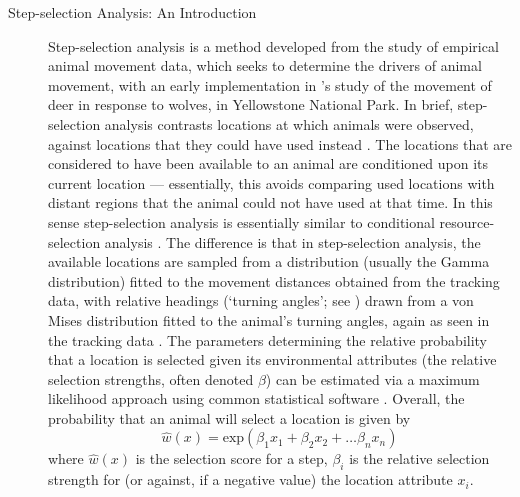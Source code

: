 \begin{tcolorbox}[width=\textwidth,
    boxsep=0pt,
    left=0pt,
    right=0pt,
    top=2pt,
    arc=0pt,
    boxrule=0.0pt,
    toprule=1pt,
    bottomrule=1pt,
    colback=white
    ]%
    \begin{description}
        \item[Step-selection Analysis: An Introduction] Step-selection analysis is a method developed from the study of empirical animal movement data, which seeks to determine the drivers of animal movement, with an early implementation in \textcite{fortin2005}'s study of the movement of deer in response to wolves, in Yellowstone National Park.
        In brief, step-selection analysis contrasts locations at which animals were observed, against locations that they could have used instead \parencite[][]{fortin2005}.
        The locations that are considered to have been available to an animal are conditioned upon its current location --- essentially, this avoids comparing used locations with distant regions that the animal could not have used at that time.
        In this sense step-selection analysis is essentially similar to conditional resource-selection analysis \parencite[see as general reference][]{manly2007}.
        The difference is that in step-selection analysis, the available locations are sampled from a distribution (usually the Gamma distribution) fitted to the movement distances obtained from the tracking data, with relative headings (`turning angles'; see \cite{calenge2009}) drawn from a von Mises distribution fitted to the animal's turning angles, again as seen in the tracking data \parencite[][]{thurfjell2014,signer2019}.
        The parameters determining the relative probability that a location is selected given its environmental attributes (the relative selection strengths, often denoted $\beta$) can be estimated via a maximum likelihood approach using common statistical software \parencite[see e.g. for R][]{therneau2000}.
        Overall, the probability that an animal will select a location is given by
        $$
            \hat{w}(x) = \text{exp}(\beta_1x_1 + \beta_2x_2 + \ldots \beta_nx_n)
        $$
        where $\hat{w}(x)$ is the selection score for a step, $\beta_i$ is the relative selection strength for (or against, if a negative value) the location attribute $x_i$.
    \end{description}
\end{tcolorbox}

